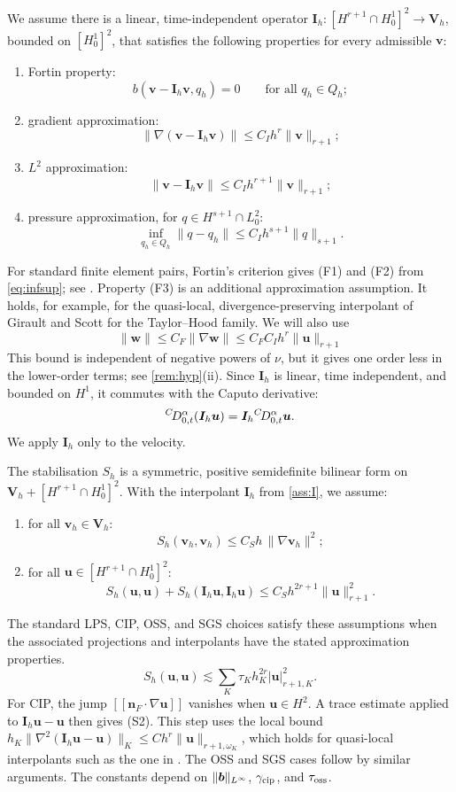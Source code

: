 \begin{assumption}\label{ass:I}
We assume there is a linear, time-independent operator $\bm I_h:[H^{r+1}\cap H^1_0]^2\to\bm V_h$, bounded on $[H^1_0]^2$, that satisfies the following properties for every admissible $\bm v$:
\begin{enumerate}[(F1),leftmargin=2.8em]
\item Fortin property:
\[
b(\bm v-\bm I_h\bm v,q_h)=0\qquad\text{for all }q_h\in Q_h ;
\]
\item gradient approximation:
\[
\|\nabla(\bm v-\bm I_h\bm v)\|\le C_Ih^r\|\bm v\|_{r+1} ;
\]
\item $L^2$ approximation:
\[
\|\bm v-\bm I_h\bm v\|\le C_Ih^{r+1}\|\bm v\|_{r+1} ;
\]
\item pressure approximation, for $q\in H^{s+1}\cap L^2_0$:
\[
\inf_{q_h\in Q_h}\|q-q_h\|\le C_Ih^{s+1}\|q\|_{s+1} .
\]
\end{enumerate}
\end{assumption}
For standard finite element pairs, Fortin's criterion gives (F1) and (F2) from \eqref{eq:infsup}; see \cite{BBF}. Property (F3) is an additional approximation assumption. It holds, for example, for the quasi-local, divergence-preserving interpolant of Girault and Scott \cite{GS03} for the Taylor--Hood family. We will also use
\[
\|\bm w\|\le C_F\|\nabla\bm w\|\le C_FC_Ih^r\|\bm u\|_{r+1}
\]
This bound is independent of negative powers of $\nu$, but it gives one order less in the lower-order terms; see \cref{rem:hyp}(ii). Since $\bm I_h$ is linear, time independent, and bounded on $H^1$, it commutes with the Caputo derivative:
\[
{}^{C}\!D_{0,t}^{\alpha}(\bm I_h\bm u)=\bm I_h{}^{C}\!D_{0,t}^{\alpha}\bm u .
\]
We apply $\bm I_h$ only to the velocity.

\begin{assumption}[Stabilisation]\label{ass:S}
The stabilisation $S_h$ is a symmetric, positive semidefinite bilinear form on $\bm V_h+[H^{r+1}\cap H^1_0]^2$. With the interpolant $\bm I_h$ from \cref{ass:I}, we assume:
\begin{enumerate}[(S1),leftmargin=2.8em]
\item for all $\bm v_h\in\bm V_h$:
\[
S_h(\bm v_h,\bm v_h)\le C_Sh\,\|\nabla\bm v_h\|^2 ;
\]
\item for all $\bm u\in[H^{r+1}\cap H^1_0]^2$:
\[
S_h(\bm u,\bm u)+S_h(\bm I_h\bm u,\bm I_h\bm u)\le C_Sh^{2r+1}\|\bm u\|_{r+1}^2 .
\]
\end{enumerate}
\end{assumption}
The standard LPS, CIP, OSS, and SGS choices satisfy these assumptions when the associated projections and interpolants have the stated approximation properties.
\[
S_h(\bm u,\bm u)\lesssim\sum_K\tau_Kh_K^{2r}|\bm u|_{r+1,K}^2 .
\]
For CIP, the jump $[\![\bm n_F\!\cdot\!\nabla\bm u]\!]$ vanishes when $\bm u\in H^2$. A trace estimate applied to $\bm I_h\bm u-\bm u$ then gives (S2). This step uses the local bound $h_K\|\nabla^2(\bm I_h\bm u-\bm u)\|_K\le Ch^r\|\bm u\|_{r+1,\omega_K}$, which holds for quasi-local interpolants such as the one in \cite{GS03}. The OSS and SGS cases follow by similar arguments. The constants depend on $\|\boldsymbol b\|_{L^\infty}$, $\gamma_{\rm cip}$, and $\tau_{\rm oss}$.


